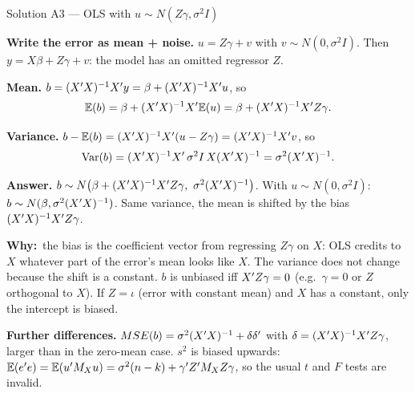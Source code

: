 \documentclass[11pt]{article}
\newcommand{\step}[1]{\par\smallskip\noindent\textbf{\textcolor{qnavy}{#1}}\quad\ignorespaces}
\newcommand{\Why}{\textbf{\textcolor{whyline}{Why:}}\ }
\newcommand{\Ans}[1]{\par\smallskip\noindent\colorbox{qlight}{\parbox{\dimexpr\linewidth-2\fboxsep}{\textbf{Answer.} #1}}\par}
\begin{document}
\begin{solbox}{Solution A3 --- OLS with $u \sim N(Z\gamma,\sigma^{2}I)$}
\step{Write the error as mean + noise.} $u = Z\gamma + v$ with $v \sim N(0,\sigma^{2}I)$.
Then $y = X\beta + Z\gamma + v$: the model has an omitted regressor $Z$.

\step{Mean.} $b = (X^{\prime} X)^{-1}X^{\prime} y = \beta + (X^{\prime} X)^{-1}X^{\prime} u$, so
\[
  \mathbb{E}(b) = \beta + (X^{\prime} X)^{-1}X^{\prime}\mathbb{E}(u) = \beta + (X^{\prime} X)^{-1}X^{\prime} Z\gamma .
\]
\step{Variance.} $b - \mathbb{E}(b) = (X^{\prime} X)^{-1}X^{\prime}(u - Z\gamma) = (X^{\prime} X)^{-1}X^{\prime} v$, so
\[
  \operatorname{Var}(b) = (X^{\prime} X)^{-1}X^{\prime}\,\sigma^{2}I\,X(X^{\prime} X)^{-1} = \sigma^{2}(X^{\prime} X)^{-1}.
\]
\Ans{$b \sim N\big(\beta + (X^{\prime} X)^{-1}X^{\prime} Z\gamma,\ \sigma^{2}(X^{\prime} X)^{-1}\big)$. With
$u \sim N(0,\sigma^{2}I)$: $b \sim N(\beta, \sigma^{2}(X^{\prime} X)^{-1})$. Same variance, the
mean is shifted by the bias $(X^{\prime} X)^{-1}X^{\prime} Z\gamma$.}
\begin{why}\Why the bias is the coefficient vector from regressing $Z\gamma$ on $X$:
OLS credits to $X$ whatever part of the error's mean looks like $X$. The variance does
not change because the shift is a constant. $b$ is unbiased iff $X^{\prime} Z\gamma = 0$ (e.g.\
$\gamma = 0$ or $Z$ orthogonal to $X$). If $Z = \iota$ (error with constant mean) and
$X$ has a constant, only the intercept is biased.\end{why}
\step{Further differences.} $MSE(b) = \sigma^{2}(X^{\prime} X)^{-1} + \delta\delta^{\prime}$ with
$\delta = (X^{\prime} X)^{-1}X^{\prime} Z\gamma$, larger than in the zero-mean case. $s^{2}$ is biased
upwards: $\mathbb{E}(e^{\prime} e) = \mathbb{E}(u^{\prime} M_{X}u) = \sigma^{2}(n-k) + \gamma^{\prime} Z^{\prime} M_{X}Z\gamma$, so
the usual $t$ and $F$ tests are invalid.
\end{solbox}
\end{document}
